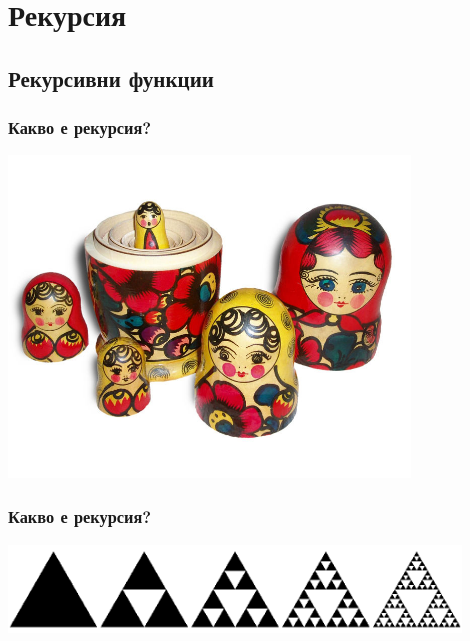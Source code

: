 \documentclass{beamer}
\begin{document}
\section{Рекурсия}

\subsection{Рекурсивни функции}

\begin{frame}
  \frametitle{Какво е рекурсия?}

  \pause
  \begin{center}
    \includegraphics[width=0.8\textwidth]{images/matroska.jpg}
  \end{center}
\end{frame}

\begin{frame}
  \frametitle{Какво е рекурсия?}

  \begin{center}
    \includegraphics[width=0.9\textwidth]{images/sierpinski.png}
  \end{center}
\end{frame}
\end{document}
